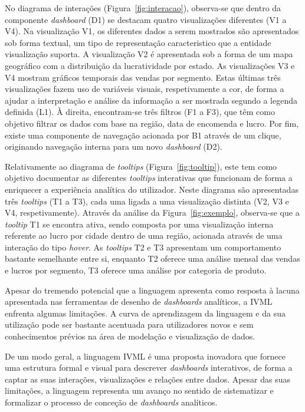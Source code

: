 No diagrama de interações (Figura~\ref{fig:interacao}), observa-se que dentro da componente \textit{dashboard} (D1) se destacam quatro visualizações diferentes (V1 a V4). Na visualização V1, os diferentes dados a serem mostrados são apresentados sob forma textual, um tipo de representação caracteristico que a entidade visualização suporta. A visualização V2 é apresentada sob a forma de um mapa geográfico com a distribuição da lucratividade por estado. As visualizações V3 e V4 mostram gráficos temporais das vendas por segmento. Estas últimas três visualizações fazem uso de variáveis visuais, respetivamente a cor, de forma a ajudar a interpretação e análise da informação a ser mostrada segundo a legenda definida (L1). À direita, encontram-se três filtros (F1 a F3), que têm como objetivo filtrar os dados com base na região, data de encomenda e lucro. Por fim, existe uma componente de navegação acionada por B1 através de um clique, originando navegação interna para um novo \textit{dashboard} (D2).

Relativamente ao diagrama de \textit{tooltips} (Figura~\ref{fig:tooltip}), este tem como objetivo documentar as diferentes \textit{tooltips} interativas que funcionam de forma a enriquecer a experiência analítica do utilizador. Neste diagrama são apresentadas três \textit{tooltips} (T1 a T3), cada uma ligada a uma visualização distinta (V2, V3 e V4, respetivamente). Através da análise da Figura~\ref{fig:exemplo}, observa-se que a \textit{tooltip} T1 se encontra ativa, sendo composta por uma visualização interna referente ao lucro por cidade dentro de uma região, acionada através de uma interação do tipo \textit{hover}. As \textit{tooltips} T2 e T3 apresentam um comportamento bastante semelhante entre si, enquanto T2 oferece uma análise mensal das vendas e lucros por segmento, T3 oferece uma análise por categoria de produto.

Apesar do tremendo potencial que a linguagem apresenta como resposta à lacuna apresentada nas ferramentas de desenho de \textit{dashboards} analíticos, a \gls{IVML} enfrenta algumas limitações. A curva de aprendizagem da linguagem e da sua utilização pode ser bastante acentuada para utilizadores novos e sem conhecimentos prévios na área de modelação e visualização de dados.

De um modo geral, a linguagem \gls{IVML} é uma proposta inovadora que fornece uma estrutura formal e visual para descrever \textit{dashboards} interativos, de forma a captar as suas interações, visualizações e relações entre dados. Apesar das suas limitações, a linguagem representa um avanço no sentido de sistematizar e formalizar o processo de conceção de \textit{dashboards} analíticos.